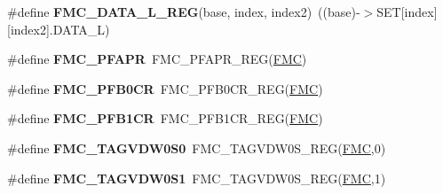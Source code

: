 \begin{DoxyCompactItemize}
\item 
\#define {\bfseries F\+M\+C\+\_\+\+D\+A\+T\+A\+\_\+\+L\+\_\+\+R\+EG}(base,  index,  index2)~((base)-\/$>$S\+ET\mbox{[}index\mbox{]}\mbox{[}index2\mbox{]}.D\+A\+T\+A\+\_\+L)\hypertarget{group__FMC__Register__Accessor__Macros_ga283c734592187ae02ee61bc0f43cbfbd}{}\label{group__FMC__Register__Accessor__Macros_ga283c734592187ae02ee61bc0f43cbfbd}

\item 
\#define {\bfseries F\+M\+C\+\_\+\+P\+F\+A\+PR}~F\+M\+C\+\_\+\+P\+F\+A\+P\+R\+\_\+\+R\+EG(\hyperlink{group__FMC__Peripheral__Access__Layer_ga970254e6dadedc433f57d43709636664}{F\+MC})\hypertarget{group__FMC__Register__Accessor__Macros_gafb8a8e5f889afe248ded426a27574f2e}{}\label{group__FMC__Register__Accessor__Macros_gafb8a8e5f889afe248ded426a27574f2e}

\item 
\#define {\bfseries F\+M\+C\+\_\+\+P\+F\+B0\+CR}~F\+M\+C\+\_\+\+P\+F\+B0\+C\+R\+\_\+\+R\+EG(\hyperlink{group__FMC__Peripheral__Access__Layer_ga970254e6dadedc433f57d43709636664}{F\+MC})\hypertarget{group__FMC__Register__Accessor__Macros_ga6db90dbda9bc68851c6e87c489f18d73}{}\label{group__FMC__Register__Accessor__Macros_ga6db90dbda9bc68851c6e87c489f18d73}

\item 
\#define {\bfseries F\+M\+C\+\_\+\+P\+F\+B1\+CR}~F\+M\+C\+\_\+\+P\+F\+B1\+C\+R\+\_\+\+R\+EG(\hyperlink{group__FMC__Peripheral__Access__Layer_ga970254e6dadedc433f57d43709636664}{F\+MC})\hypertarget{group__FMC__Register__Accessor__Macros_gaaa779f6efa9e2ffa004f9820c0dd2566}{}\label{group__FMC__Register__Accessor__Macros_gaaa779f6efa9e2ffa004f9820c0dd2566}

\item 
\#define {\bfseries F\+M\+C\+\_\+\+T\+A\+G\+V\+D\+W0\+S0}~F\+M\+C\+\_\+\+T\+A\+G\+V\+D\+W0\+S\+\_\+\+R\+EG(\hyperlink{group__FMC__Peripheral__Access__Layer_ga970254e6dadedc433f57d43709636664}{F\+MC},0)\hypertarget{group__FMC__Register__Accessor__Macros_ga08d4b90c8e72268ad41591521e7df7d7}{}\label{group__FMC__Register__Accessor__Macros_ga08d4b90c8e72268ad41591521e7df7d7}

\item 
\#define {\bfseries F\+M\+C\+\_\+\+T\+A\+G\+V\+D\+W0\+S1}~F\+M\+C\+\_\+\+T\+A\+G\+V\+D\+W0\+S\+\_\+\+R\+EG(\hyperlink{group__FMC__Peripheral__Access__Layer_ga970254e6dadedc433f57d43709636664}{F\+MC},1)\hypertarget{group__FMC__Register__Accessor__Macros_gab0cb5db7eacdaa6c0f4317a6af85ee1e}{}\label{group__FMC__Register__Accessor__Macros_gab0cb5db7eacdaa6c0f4317a6af85ee1e}


\end{DoxyCompactItemize}
